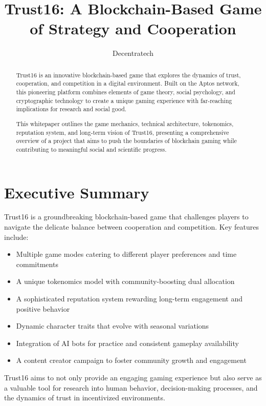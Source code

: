 \documentclass[12pt,a4paper]{article}
\title{Trust16: A Blockchain-Based Game of Strategy and Cooperation}
\author{Decentratech}
\date{}
\begin{document}
\maketitle

\begin{abstract}
Trust16 is an innovative blockchain-based game that explores the dynamics of trust, cooperation, and competition in a digital environment. Built on the Aptos network, this pioneering platform combines elements of game theory, social psychology, and cryptographic technology to create a unique gaming experience with far-reaching implications for research and social good.

This whitepaper outlines the game mechanics, technical architecture, tokenomics, reputation system, and long-term vision of Trust16, presenting a comprehensive overview of a project that aims to push the boundaries of blockchain gaming while contributing to meaningful social and scientific progress.
\end{abstract}

\tableofcontents

\section{Executive Summary}

Trust16 is a groundbreaking blockchain-based game that challenges players to navigate the delicate balance between cooperation and competition. Key features include:

\begin{itemize}
    \item Multiple game modes catering to different player preferences and time commitments
    \item A unique tokenomics model with community-boosting dual allocation
    \item A sophisticated reputation system rewarding long-term engagement and positive behavior
    \item Dynamic character traits that evolve with seasonal variations
    \item Integration of AI bots for practice and consistent gameplay availability
    \item A content creator campaign to foster community growth and engagement
\end{itemize}

Trust16 aims to not only provide an engaging gaming experience but also serve as a valuable tool for research into human behavior, decision-making processes, and the dynamics of trust in incentivized environments.
\end{document}
